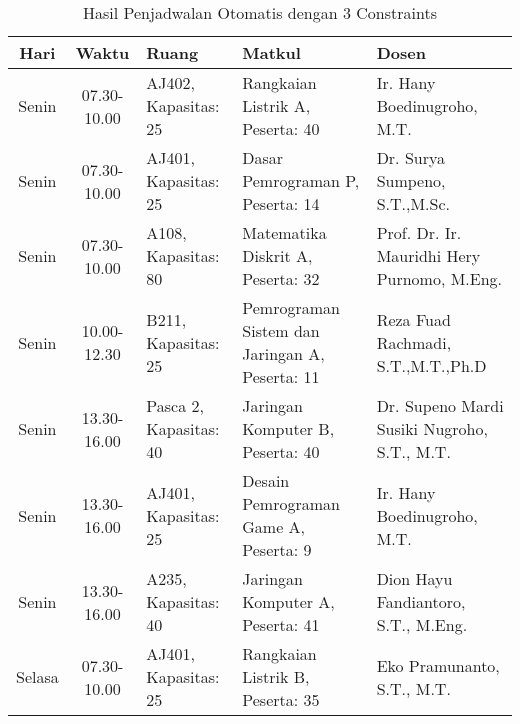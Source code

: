  \begin{longtable}[c]{|c|c|>{\centering\arraybackslash}m{2.5cm}|>{\centering\arraybackslash}m{4cm}|>{\centering\arraybackslash}m{3.2cm}|}
    \caption{Hasil Penjadwalan Otomatis dengan 3 Constraints}
    \label{tab:3}\\
    \hline
    \rowcolor[HTML]{C0C0C0} 
    Hari   & Waktu       & Ruang                  & Matkul                                                              & Dosen                                         \\ \hline
    Senin  & 07.30-10.00 & AJ402, Kapasitas: 25   & Rangkaian Listrik A, \linebreak Peserta: 40                         & Ir. Hany Boedinugroho, M.T.                   \\ \hline
    Senin  & 07.30-10.00 & AJ401, Kapasitas: 25   & Dasar Pemrograman P, \linebreak Peserta: 14                         & Dr. Surya Sumpeno, S.T.,M.Sc.                 \\ \hline
    Senin  & 07.30-10.00 & A108, Kapasitas: 80    & Matematika Diskrit A, \linebreak Peserta: 32                        & Prof. Dr. Ir. Mauridhi Hery Purnomo, M.Eng.   \\ \hline
    Senin  & 10.00-12.30 & B211, Kapasitas: 25    & Pemrograman Sistem dan Jaringan A, \linebreak Peserta: 11           & Reza Fuad Rachmadi, S.T.,M.T.,Ph.D            \\ \hline
    Senin  & 13.30-16.00 & Pasca 2, Kapasitas: 40 & Jaringan Komputer B, \linebreak Peserta: 40                         & Dr. Supeno Mardi Susiki Nugroho, S.T., M.T.   \\ \hline
    Senin  & 13.30-16.00 & AJ401, Kapasitas: 25   & Desain Pemrograman Game A, \linebreak Peserta: 9                    & Ir. Hany Boedinugroho, M.T.                   \\ \hline
    Senin  & 13.30-16.00 & A235, Kapasitas: 40    & Jaringan Komputer A, \linebreak Peserta: 41                         & Dion Hayu Fandiantoro, S.T., M.Eng.           \\ \hline
    Selasa & 07.30-10.00 & AJ401, Kapasitas: 25   & Rangkaian Listrik B, \linebreak Peserta: 35                         & Eko Pramunanto, S.T., M.T.                    \\ \hline

\end{longtable}
